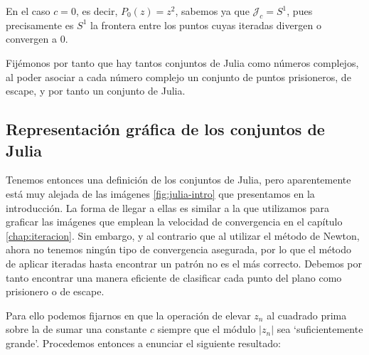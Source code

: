 \begin{ejemplo}
  En el caso $c=0$, es decir, $P_0(z)=z^2$, sabemos ya que $\mathcal{J}_c=S^1$, pues precisamente es $S^1$ la frontera entre los puntos cuyas iteradas divergen o convergen a $0$.
\end{ejemplo}

\begin{observacion}
  Fijémonos por tanto que hay tantos conjuntos de Julia como números complejos, al poder asociar a cada número complejo un conjunto de puntos prisioneros, de escape, y por tanto un conjunto de Julia.
\end{observacion}

\subsection{Representación gráfica de los conjuntos de Julia}
\label{subsection:representacion-julia}

Tenemos entonces una definición de los conjuntos de Julia, pero aparentemente está muy alejada de las imágenes \ref{fig:julia-intro} que presentamos en la introducción. La forma de llegar a ellas es similar a la que utilizamos para graficar las imágenes que emplean la velocidad de convergencia en el capítulo \ref{chap:iteracion}. Sin embargo, y al contrario que al utilizar el método de Newton, ahora no tenemos ningún tipo de convergencia asegurada, por lo que el método de aplicar iteradas hasta encontrar un patrón no es el más correcto. Debemos por tanto encontrar una manera eficiente de clasificar cada punto del plano como prisionero o de escape. 

Para ello podemos fijarnos en que la operación de elevar $z_n$ al cuadrado prima sobre la de sumar una constante $c$ siempre que el módulo $|z_n|$ sea `suficientemente grande'. Procedemos entonces a enunciar el siguiente resultado:

